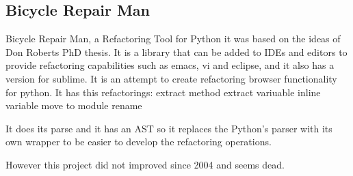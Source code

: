 \subsection{Bicycle Repair Man}

Bicycle Repair Man, a Refactoring Tool for Python it was based on the ideas of Don Roberts PhD thesis. It is a library that can be added to IDEs and editors to provide refactoring capabilities such as emacs, vi and eclipse, and it also has a version for sublime.
It is an attempt to create refactoring browser functionality for python. 
It has this refactorings:
extract method
extract variuable
inline variable
move to module
rename

It does its parse and it has an AST so it replaces the Python's parser with its own wrapper to be easier to develop the refactoring operations.

However this project did not improved since 2004 and seems dead.

